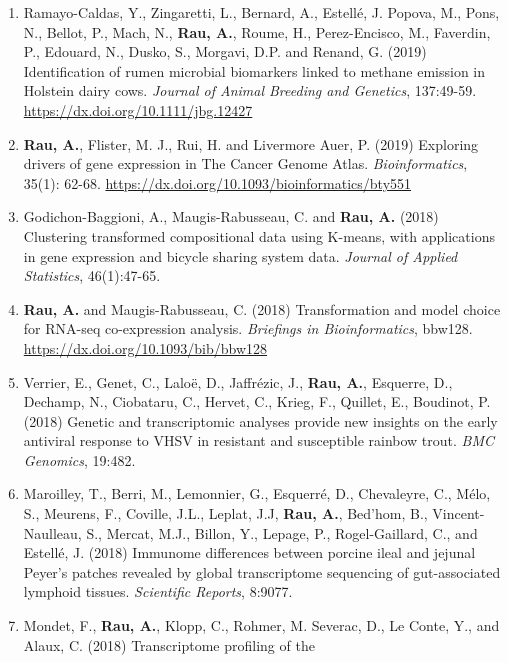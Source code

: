 \documentclass[11pt, a4paper]{awesome-cv}
\begin{document}
\begin{enumerate}
  the commonly amplified 8q12.1 and 8q22.1 regions in human breast
  cancer patients. \emph{G3: Genes\textbar Genomes\textbar Genetics},
  9(5): 1739-1743. \url{https://dx.doi.org/10.1534/g3.118.200873}
\item
  Ramayo-Caldas, Y., Zingaretti, L., Bernard, A., Estellé, J. Popova,
  M., Pons, N., Bellot, P., Mach, N., \textbf{Rau, A.}, Roume, H.,
  Perez-Encisco, M., Faverdin, P., Edouard, N., Dusko, S., Morgavi, D.P.
  and Renand, G. (2019) Identification of rumen microbial biomarkers
  linked to methane emission in Holstein dairy cows. \emph{Journal of
  Animal Breeding and Genetics}, 137:49-59.
  \url{https://dx.doi.org/10.1111/jbg.12427}
\item
  \textbf{Rau, A.}, Flister, M. J., Rui, H. and Livermore Auer, P.
  (2019) Exploring drivers of gene expression in The Cancer Genome
  Atlas. \emph{Bioinformatics}, 35(1): 62-68.
  \url{https://dx.doi.org/10.1093/bioinformatics/bty551}
\item
  Godichon-Baggioni, A., Maugis-Rabusseau, C. and \textbf{Rau, A.}
  (2018) Clustering transformed compositional data using K-means, with
  applications in gene expression and bicycle sharing system data.
  \emph{Journal of Applied Statistics}, 46(1):47-65.
\item
  \textbf{Rau, A.} and Maugis-Rabusseau, C. (2018) Transformation and
  model choice for RNA-seq co-expression analysis. \emph{Briefings in
  Bioinformatics}, bbw128. \url{https://dx.doi.org/10.1093/bib/bbw128}
\item
  Verrier, E., Genet, C., Laloë, D., Jaffrézic, J., \textbf{Rau, A.},
  Esquerre, D., Dechamp, N., Ciobataru, C., Hervet, C., Krieg, F.,
  Quillet, E., Boudinot, P. (2018) Genetic and transcriptomic analyses
  provide new insights on the early antiviral response to VHSV in
  resistant and susceptible rainbow trout. \emph{BMC Genomics}, 19:482.
\item
  Maroilley, T., Berri, M., Lemonnier, G., Esquerré, D., Chevaleyre, C.,
  Mélo, S., Meurens, F., Coville, J.L., Leplat, J.J, \textbf{Rau, A.},
  Bed'hom, B., Vincent-Naulleau, S., Mercat, M.J., Billon, Y., Lepage,
  P., Rogel-Gaillard, C., and Estellé, J. (2018) Immunome differences
  between porcine ileal and jejunal Peyer's patches revealed by global
  transcriptome sequencing of gut-associated lymphoid tissues.
  \emph{Scientific Reports}, 8:9077.
\item
  Mondet, F., \textbf{Rau, A.}, Klopp, C., Rohmer, M. Severac, D., Le
  Conte, Y., and Alaux, C. (2018) Transcriptome profiling of the

\end{enumerate}
\end{document}
